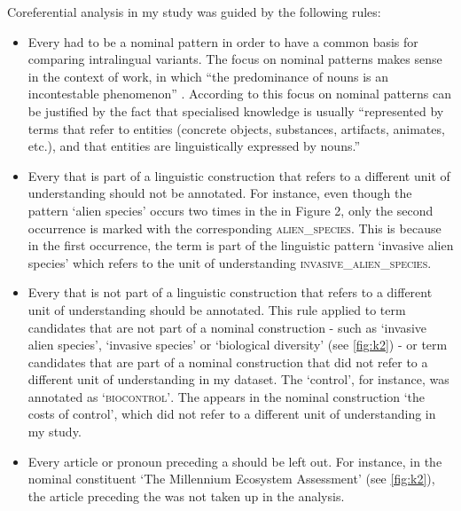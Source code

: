 \documentclass[output=paper]{langsci/langscibook.cls}
\begin{document}
Coreferential analysis in my study was guided by the following rules:

\begin{itemize}
	
\item Every  had to be a nominal pattern in order to have a common basis for comparing intralingual variants. The focus 
on nominal patterns makes sense in the context of  work, in which ``the 
predominance of nouns is an incontestable phenomenon'' \citep[19]{Bae2006}. According 
to \citet[404]{Lhomme2003} this focus on nominal patterns can be justified by the fact 
that specialised knowledge is usually ``represented by terms that refer to entities 
(concrete objects, substances, artifacts, animates, etc.), and that entities are 
linguistically expressed by nouns.''

\item Every  that is part of a linguistic construction that refers to a different unit of understanding should not be annotated. For instance, even 
though the pattern `alien species' occurs two times in the  in Figure 2, only the second occurrence is marked with the corresponding \textsc{alien\_species}. 
This is because in the first occurrence, the term is part of the linguistic pattern `invasive alien species' which refers to the unit of understanding \textsc{invasive\_alien\_species}.

\item Every  that is not part of a linguistic construction that refers to a different unit of understanding should be annotated. This rule applied to 
term candidates that are not part of a nominal construction - such as `invasive alien species', `invasive species' or `biological diversity' (see \ref{fig:k2}) - or 
term candidates that are part of a nominal construction that did not refer to a 
different unit of understanding in my dataset. The  `control', for 
instance, was annotated as `\textsc{biocontrol'}. The  appears in 
the nominal construction `the costs of control', which did not refer to a different 
unit of understanding in my study. 

\item Every article or pronoun preceding a  should be left out. For 
instance, in the nominal constituent `The Millennium Ecosystem Assessment' (see 
\ref{fig:k2}), the article preceding the  was not taken up in the analysis. 


\end{itemize}
\end{document}

